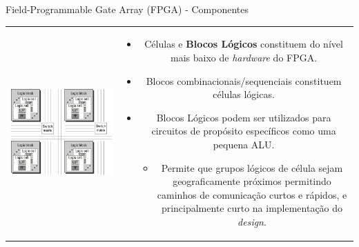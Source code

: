 \documentclass[aspectratio=169]{beamer}
\begin{document}
	\begin{frame}{Field-Programmable Gate Array (FPGA) - Componentes}
		\begin{tabular}{cc}
			\begin{minipage}{0.35\textwidth}
				\includegraphics[height=0.62\textheight]{img/print/componentes-fpga.png}
			\end{minipage}
			&
			\begin{minipage}{0.65\textwidth}
				\begin{itemize}
					\setlength\itemsep{1.5em}
					\item Células e \textbf{Blocos Lógicos} constituem do nível mais baixo de \textit{hardware} do FPGA.
					
					\item Blocos combinacionais/sequenciais constituem células lógicas.
					
					\item Blocos Lógicos podem ser utilizados para circuitos de propósito específicos como uma pequena ALU.
					\begin{itemize}
						\item Permite que grupos lógicos de célula sejam geograficamente próximos permitindo caminhos de comunicação curtos e rápidos, e principalmente curto na implementação do \textit{design}.
					\end{itemize}
					
				\end{itemize}
			\end{minipage}
		\end{tabular}
	\end{frame}
	
\end{document}
